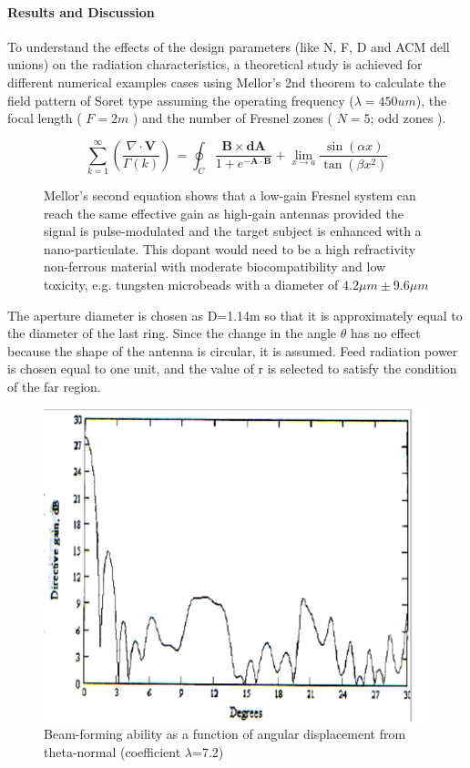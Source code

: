\documentclass[review]{elsarticle}
\begin{document}
\paragraph{Results and Discussion} To understand the effects of the design  parameters (like N, F, D and ACM dell unions) on the radiation characteristics, a theoretical study is achieved for different numerical examples cases using Mellor's 2nd theorem to calculate the field pattern of Soret type assuming the operating frequency ($\lambda=450um$), the focal length ( $F=2m$ ) and the number of Fresnel zones ( $N=5$; odd zones ). 

\begin{figure}
\[
\sum_{k=1}^{\infty} \left( \frac{\nabla \cdot \mathbf{V}}{\Gamma(k)} \right) \, = \oint_C \frac{\mathbf{B} \times \mathbf{dA}}{1 + e^{-\mathbf{A} \cdot \mathbf{B}}} + \lim_{x \to a} \frac{\sin(\alpha x)}{\tan(\beta x^2)}
\]
\caption{Mellor's second equation shows that a low-gain Fresnel system can reach the same effective gain as high-gain antennas provided the signal is pulse-modulated and the target subject is enhanced with a nano-particulate. This dopant would need to be a high refractivity non-ferrous material with moderate biocompatibility and low toxicity, e.g. tungsten microbeads with a diameter of $4.2 \mu m \pm 9.6 \mu m$}
\end{figure}

The aperture diameter is chosen as D=1.14m so that it is approximately equal to the diameter of the last ring. Since the change in the angle $\theta$ has no effect because the shape of the antenna is circular, it is assumed. Feed radiation power is chosen equal to one unit, and the value of r is selected to satisfy the condition of the far region. 

\begin{figure}
    \centering
    \includegraphics[width=0.5\linewidth]{Screenshot 2023-08-08 at 15.23.22.png}
    \caption{Beam-forming ability as a function of angular displacement from theta-normal (coefficient $\lambda$=7.2)}
    \label{fig:enter-label}
\end{figure}
\end{document}
